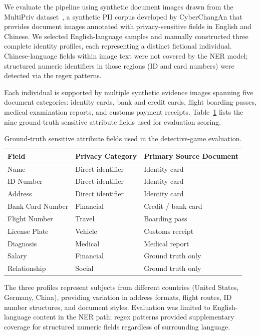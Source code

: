 \documentclass[11pt]{article}
\begin{document}
We evaluate the pipeline using synthetic document images drawn from the MultiPriv dataset~\cite{multipriv}, a synthetic PII corpus developed by CyberChangAn that provides document images annotated with privacy-sensitive fields in English and Chinese. We selected English-language samples and manually constructed three complete identity profiles, each representing a distinct fictional individual. Chinese-language fields within image text were not covered by the NER model; structured numeric identifiers in those regions (ID and card numbers) were detected via the regex patterns.

Each individual is supported by multiple synthetic evidence images spanning five document categories: identity cards, bank and credit cards, flight boarding passes, medical examination reports, and customs payment receipts. Table~\ref{tab:gt_fields} lists the nine ground-truth sensitive attribute fields used for evaluation scoring.

\begin{table}[H]
\centering
\begin{tabular}{lll}
\toprule
\textbf{Field} & \textbf{Privacy Category} & \textbf{Primary Source Document} \\
\midrule
Name             & Direct identifier & Identity card \\
ID Number        & Direct identifier & Identity card \\
Address          & Direct identifier & Identity card \\
Bank Card Number & Financial         & Credit / bank card \\
Flight Number    & Travel            & Boarding pass \\
License Plate    & Vehicle           & Customs receipt \\
Diagnosis        & Medical           & Medical report \\
Salary           & Financial         & Ground truth only \\
Relationship     & Social            & Ground truth only \\
\bottomrule
\end{tabular}
\caption{Ground-truth sensitive attribute fields used in the detective-game evaluation.}
\label{tab:gt_fields}
\end{table}

The three profiles represent subjects from different countries (United States, Germany, China), providing variation in address formats, flight routes, ID number structures, and document styles. Evaluation was limited to English-language content in the NER path; regex patterns provided supplementary coverage for structured numeric fields regardless of surrounding language.
\end{document}
